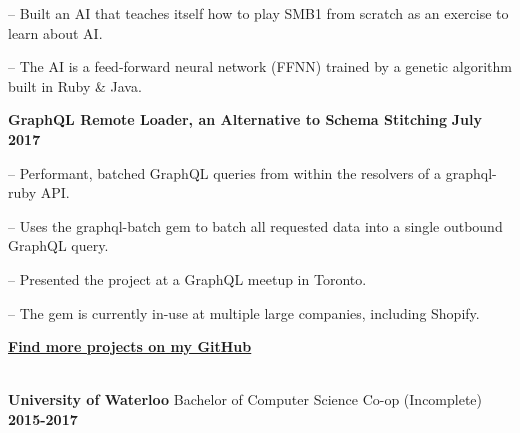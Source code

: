 \documentclass[12pt]{extarticle}
\begin{document}
{{        \begin{compactitem}
            \setlength{\itemindent}{0.5cm}
            \item[--] Built an AI that teaches itself how to play SMB1 from scratch as an exercise to learn about AI.
            \item[--] The AI is a feed-forward neural network (FFNN) trained by a genetic algorithm built in Ruby \& Java.
        \end{compactitem}
    }

     \vspace{0.3cm}
     
    {\indent
        \textbf{GraphQL Remote Loader, an Alternative to Schema Stitching} \hfill \textbf{July 2017}

        \begin{compactitem}
            \setlength{\itemindent}{0.5cm}
            \item[--] Performant, batched GraphQL queries from within the resolvers of a graphql-ruby API.
            \item[--] Uses the graphql-batch gem to batch all requested data into a single outbound GraphQL query.
            \item[--] Presented the project at a GraphQL meetup in Toronto.
            \item[--] The gem is currently in-use at multiple large companies, including Shopify.
        \end{compactitem}
    }

    \vspace{0.3cm}
    \noindent
    {\indent
        \href{https://github.com/d12}{\textbf{Find more projects on my GitHub}}
    }

    \vspace{0.8cm}
    \\

    \vspace{-0.2cm}
    {\indent
        \textbf{University of Waterloo} Bachelor of Computer Science Co-op (Incomplete) \hfill \textbf{2015-2017}
    }
}
\end{document}
